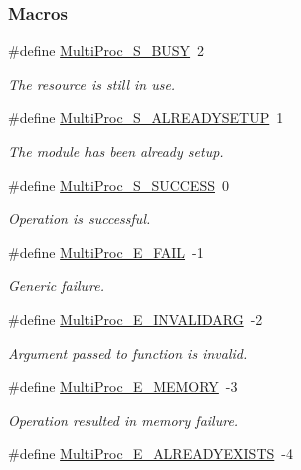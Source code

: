 \subsubsection*{Macros}
\begin{DoxyCompactItemize}
\item 
\#define \hyperlink{_multi_proc_8h_a419e76c904cc23e3ab274bd49d4ba2f0}{Multi\-Proc\-\_\-\-S\-\_\-\-B\-U\-S\-Y}~2
\begin{DoxyCompactList}\small\item\em The resource is still in use. \end{DoxyCompactList}\item 
\#define \hyperlink{_multi_proc_8h_a67c6af51e4eee99a2e57b498ba943366}{Multi\-Proc\-\_\-\-S\-\_\-\-A\-L\-R\-E\-A\-D\-Y\-S\-E\-T\-U\-P}~1
\begin{DoxyCompactList}\small\item\em The module has been already setup. \end{DoxyCompactList}\item 
\#define \hyperlink{_multi_proc_8h_a88ef69134ed8907ec46443a8c5445acd}{Multi\-Proc\-\_\-\-S\-\_\-\-S\-U\-C\-C\-E\-S\-S}~0
\begin{DoxyCompactList}\small\item\em Operation is successful. \end{DoxyCompactList}\item 
\#define \hyperlink{_multi_proc_8h_ac3e4ff7eac6f0fe38b97b1ca086ea1c6}{Multi\-Proc\-\_\-\-E\-\_\-\-F\-A\-I\-L}~-\/1
\begin{DoxyCompactList}\small\item\em Generic failure. \end{DoxyCompactList}\item 
\#define \hyperlink{_multi_proc_8h_a898d3875868db40c49e5c28100c2accb}{Multi\-Proc\-\_\-\-E\-\_\-\-I\-N\-V\-A\-L\-I\-D\-A\-R\-G}~-\/2
\begin{DoxyCompactList}\small\item\em Argument passed to function is invalid. \end{DoxyCompactList}\item 
\#define \hyperlink{_multi_proc_8h_aaa847e4fc5b581994dff79bcfc859bce}{Multi\-Proc\-\_\-\-E\-\_\-\-M\-E\-M\-O\-R\-Y}~-\/3
\begin{DoxyCompactList}\small\item\em Operation resulted in memory failure. \end{DoxyCompactList}\item 
\#define \hyperlink{_multi_proc_8h_a18f5c0436a877611489726c797d86556}{Multi\-Proc\-\_\-\-E\-\_\-\-A\-L\-R\-E\-A\-D\-Y\-E\-X\-I\-S\-T\-S}~-\/4

\end{DoxyCompactItemize}
